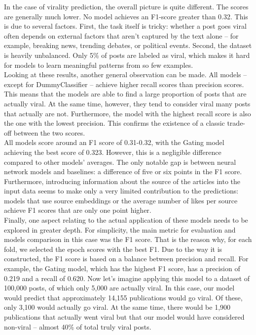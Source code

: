 \documentclass[a4paper,twoside,12pt]{book}
\begin{document}
In the case of virality prediction, the overall picture is quite different. The scores are generally much lower. No model achieves an F1-score greater than 0.32. This is due to several factors. First, the task itself is tricky: whether a post goes viral often depends on external factors that aren’t captured by the text alone -- for example, breaking news, trending debates, or political events. Second, the dataset is heavily unbalanced. Only 5\% of posts are labeled as viral, which makes it hard for models to learn meaningful patterns from so few examples.\\

Looking at these results, another general observation can be made. All models -- except for DummyClassifier -- achieve higher recall scores than precision scores. This means that the models are able to find a large proportion of posts that are actually viral. At the same time, however, they tend to consider viral many posts that actually are not. Furthermore, the model with the highest recall score is also the one with the lowest precision. This confirms the existence of a classic trade-off between the two scores.\\

All models score around an F1 score of 0.31-0.32, with the Gating model achieving the best score of 0.323. However, this is a negligible difference compared to other models' averages. The only notable gap is between neural network models and baselines: a difference of five or six points in the F1 score. Furthermore, introducing information about the source of the articles into the input data seems to make only a very limited contribution to the predictions: models that use source embeddings or the average number of likes per source achieve F1 scores that are only one point higher.\\

Finally, one aspect relating to the actual application of these models needs to be explored in greater depth. For simplicity, the main metric for evaluation and models comparison in this case was the F1 score. That is the reason why, for each fold, we selected the epoch scores with the best F1. Due to the way it is constructed, the F1 score is based on a balance between precision and recall. For example, the Gating model, which has the highest F1 score, has a precision of 0.219 and a recall of 0.620. Now let's imagine applying this model to a dataset of 100,000 posts, of which only 5,000 are actually viral. In this case, our model would predict that approximately 14,155 publications would go viral. Of these, only 3,100 would actually go viral. At the same time, there would be 1,900 publications that actually went viral but that our model would have considered non-viral -- almost 40\% of total truly viral posts.\\
\end{document}
